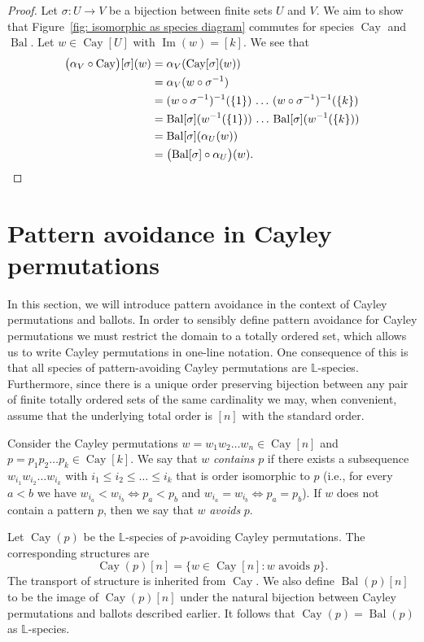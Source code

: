 \documentclass[a4paper, 11pt]{article}
\DeclareMathOperator{\Bal}{Bal}
\DeclareMathOperator{\Cay}{Cay}
\DeclareMathOperator{\Img}{Im}
\newcommand{\LL}{\mathbb{L}}
\theoremstyle{definition}
\begin{document}
\begin{proof}
Let $\sigma: U \to V$ be a bijection between finite sets $U$ and $V$. We
aim to show that Figure~\ref{fig: isomorphic as species diagram}
commutes for species $\Cay$ and $\Bal$. Let $w \in \Cay[U]$ with
$\Img(w)=[k]$. We see that
\begin{align*}
   \bigl(\alpha_V \circ \Cay\bigr)[\sigma] (w)
  &= \alpha_V( \Cay[\sigma] (w)) \\
  &= \alpha_V(w \circ \sigma^{-1}) \\
  &= (w\circ \sigma^{-1})^{-1}(\{1\})\, \dots\, (w\circ \sigma^{-1})^{-1}(\{k\}) \\
  &= \Bal[\sigma](w^{-1}(\{1\})) \, \dots\, \Bal[\sigma](w^{-1}(\{k\})) \\
  &= \Bal[\sigma]( \alpha_U (w)) \\
  &= \bigl(\Bal[\sigma]\circ \alpha_U\bigr)(w). \qedhere
\end{align*}
\end{proof}

\section{Pattern avoidance in Cayley permutations}\label{sec:pattsonCayley}

In this section, we will introduce pattern avoidance in the context of
Cayley permutations and ballots. In order to sensibly define pattern
avoidance for Cayley permutations we must restrict the domain to a
totally ordered set, which allows us to write Cayley permutations 
in one-line notation. One consequence of this is that all species of 
pattern-avoiding Cayley permutations are $\LL$-species. Furthermore, since 
there is a unique order preserving
bijection between any pair of finite totally ordered sets of the same
cardinality we may, when convenient, assume that the underlying total
order is $[n]$ with the standard order.

Consider the Cayley permutations
$w = w_1 w_2 \ldots w_n \in \Cay[n] $ and
$p = p_1 p_2 \ldots p_k \in \Cay[k]$. We say that $w$
\emph{contains} $p$ if there exists a subsequence
$w_{i_1}w_{i_2} \ldots w_{i_k}$ with $i_1 \leq i_2 \leq \ldots \leq i_k$
that is order isomorphic to $p$
(i.e., for every $a<b$ we have $w_{i_a}<w_{i_b}\Leftrightarrow p_a<p_b$ and
$w_{i_a}=w_{i_b} \Leftrightarrow p_a=p_b$).
If $w$ does not contain a pattern $p$, then we say that
$w$ \emph{avoids} $p$.

Let $\Cay(p)$ be the $\LL$-species of $p$-avoiding Cayley permutations.
The corresponding structures are
\[
\Cay(p)[n] = \{ w\in \Cay[n] : w \text{ avoids } p \}.
\]
The transport of structure is inherited from $\Cay$.
We also define $\Bal(p)[n]$ to be the
image of $\Cay(p)[n]$ under the natural bijection between
Cayley permutations and ballots described earlier.
It follows that $\Cay(p) = \Bal(p)$ as $\LL$-species.
\end{document}
